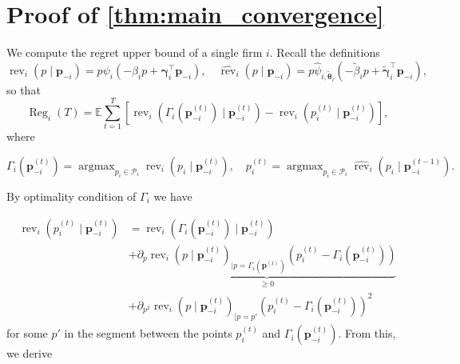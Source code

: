 \documentclass{article} %
\begin{document}

\newpage

\section{Proof of \cref{thm:main_convergence}}\label{app:main_convergence}
We compute the regret upper bound of a single firm $i$. Recall the definitions
$$
\operatorname{rev}_i(p \mid \mathbf{p}_{-i}) = p\psi_i( -\beta_i p+\boldsymbol{\gamma}_i^{\top} \mathbf{p}_{-i}),\quad \widehat{ \operatorname{rev}}_i(p \mid \mathbf{p}_{-i}) =  p\widehat{\psi}_{i,\widetilde{\boldsymbol{\theta}}_i}( -\widetilde{\beta}_i p+\widetilde{\boldsymbol{\gamma}}_i^{\top} \mathbf{p}_{-i}),
$$
so that 
$$
\operatorname{Reg}_i(T)=\mathbb{E} \sum_{t=1}^T[  \operatorname{rev}_i(\Gamma_i(\mathbf{p}^{(t)}_{-i}) \mid \mathbf{p}_{-i}^{(t)}) -  \operatorname{rev}_i(p^{(t)}_i \mid \mathbf{p}_{-i}^{(t)}) ],
$$
where

$$
\Gamma_i(\mathbf{p}^{(t)}_{-i}) = \operatorname{argmax}_{p_i \in \mathcal{P}_i} \operatorname{rev}_i(p_i \mid \mathbf{p}_{-i}^{(t)}), \quad p_i^{(t)} = \operatorname{argmax}_{p_i \in \mathcal{P}_i} \widehat{\operatorname{rev}}_i(p_i \mid \mathbf{p}_{-i}^{(t-1)}).
$$
\noindent

By optimality condition of $\Gamma_i$ we have

\begin{align*}
\operatorname{rev}_i(p^{(t)}_i \mid \mathbf{p}_{-i}^{(t)}) & = \operatorname{rev}_i(\Gamma_i(\mathbf{p}^{(t)}_{-i}) \mid \mathbf{p}_{-i}^{(t)}) \\
& + \underset{\geq 0}{\underbrace{\partial_{p}\operatorname{rev}_i(p \mid \mathbf{p}_{-i}^{(t)})_{|p= \Gamma_i(\mathbf{p}^{(t)})}(p_i^{(t)}- \Gamma_i(\mathbf{p}^{(t)}_{-i}))}} \\
& + \partial_{p^2}\operatorname{rev}_i(p \mid \mathbf{p}_{-i}^{(t)})_{|p= p'}(p_i^{(t)}-\Gamma_i(\mathbf{p}^{(t)}_{-i}))^2
\end{align*}
for some $p'$ in the segment between the points  $p_i^{(t)}$ and $\Gamma_i(\mathbf{p}^{(t)}_{-i})$. From this, we derive
\end{document}
